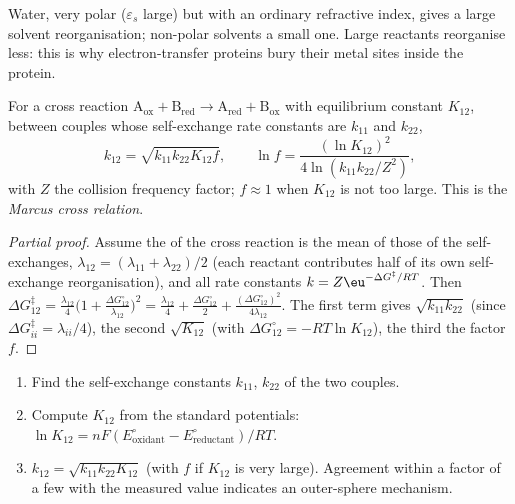 \admitted

Water, very polar ($\varepsilon_s$ large) but with an ordinary refractive index, gives a large
solvent reorganisation; non-polar solvents a small one. Large reactants
reorganise less: this is why electron-transfer proteins bury their metal sites
inside the protein.

\begin{theorem}\label{thm:b3:complex-mechanisms:cross-relation}
For a cross reaction $\mathrm{A_{ox} + B_{red} \to A_{red} + B_{ox}}$ with equilibrium constant $K_{12}$, between couples
whose self-exchange rate constants are $k_{11}$ and $k_{22}$,
\[
  k_{12} = \sqrt{k_{11}k_{22}K_{12}f}, \qquad \ln f = \frac{(\ln K_{12})^2}{4\ln(k_{11}k_{22}/Z^2)},
\]
with $Z$ the collision frequency factor; $f \approx 1$ when $K_{12}$ is not too large. This is the
\emph{Marcus cross relation}.
\end{theorem}

\begin{proof}[Partial proof]
Assume the  of the cross reaction is the mean of those of the
self-exchanges, $\lambda_{12} = (\lambda_{11} + \lambda_{22})/2$ (each reactant contributes half of its own
self-exchange reorganisation), and all rate constants $k = Z\eu^{-\Delta G^{\ddagger}/RT}$. Then
$\Delta G_{12}^{\ddagger} = \frac{\lambda_{12}}{4}\bigl(1 + \frac{\Delta G^\circ_{12}}{\lambda_{12}}\bigr)^2 = \frac{\lambda_{12}}{4} + \frac{\Delta G^\circ_{12}}{2} + \frac{(\Delta G^\circ_{12})^2}{4\lambda_{12}}$. The first term gives
$\sqrt{k_{11}k_{22}}$ (since $\Delta G^{\ddagger}_{ii} = \lambda_{ii}/4$), the second $\sqrt{K_{12}}$ (with $\Delta G^\circ_{12} = -RT\ln K_{12}$), the third
the factor $f$.
\end{proof}

\begin{method}\label{met:b3:complex-mechanisms:marcus-estimate}
\begin{enumerate}
  \item Find the self-exchange constants $k_{11}$, $k_{22}$ of the two couples.
  \item Compute $K_{12}$ from the standard potentials: $\ln K_{12} = nF(E^\circ_{\text{oxidant}} - E^\circ_{\text{reductant}})/RT$.
  \item $k_{12} = \sqrt{k_{11}k_{22}K_{12}}$ (with $f$ if $K_{12}$ is very large). Agreement within a factor of a
        few with the measured value indicates an outer-sphere mechanism.
\end{enumerate}
\end{method}

